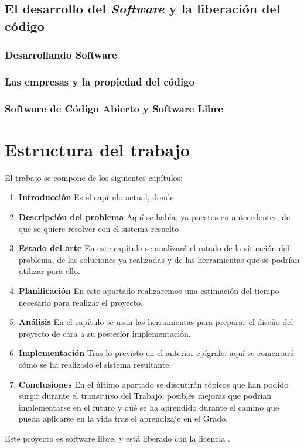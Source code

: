 \subsection{El desarrollo del \textit{Software} y la liberación del código }
\subsubsection{Desarrollando Software}
\subsubsection{Las empresas y la propiedad del código}
\subsubsection{Software de Código Abierto y Software Libre}

\section{Estructura del trabajo}

El trabajo se compone de los siguientes capítulos:

\begin{enumerate}[C{a}pítulo 1.- ]
	\item \textbf{Introducción} Es el capítulo actual, donde 
	\item \textbf{Descripción del problema} Aquí se habla, ya puestos en antecedentes, de qué se quiere resolver con el sistema resuelto
	\item \textbf{Estado del arte} En este capítulo se analizará el estado de la situación del problema, de las soluciones ya realizadas y de las herramientas que se podrían utilizar para ello.
	\item \textbf{Planificación} En este apartado realizaremos una estimación del tiempo necesario para realizar el proyecto.
	\item \textbf{Análisis} En el capítulo se usan las herramientas para preparar el diseño del proyecto de cara a su posterior implementación.
	\item \textbf{Implementación} Tras lo previsto en el anterior epígrafe, aquí se comentará cómo se ha realizado el sistema resultante.
	\item \textbf{Conclusiones} En el último apartado se discutirán tópicos que han podido surgir durante el transcurso del Trabajo, posibles mejoras que podrían implementarse en el futuro y qué se ha aprendido durante el camino que pueda aplicarse en la vida tras el aprendizaje en el Grado.
\end{enumerate}

Este proyecto es software libre, y está liberado con la licencia \cite{gplv3}.
